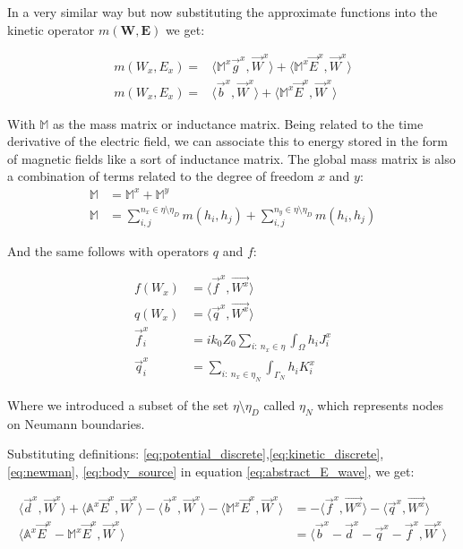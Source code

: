 In a very similar way but now substituting the approximate functions into the kinetic operator $m(\mathbf{W},\mathbf{E})$ we get:

\begin{align}
m\left(W_x,E_x\right)=&\langle \mathbb{M}^x\vec{g}^x,\vec{W}^x\rangle
+\langle\mathbb{M}^x\vec{E}^x,\vec{W}^x\rangle\nonumber \\
m\left(W_x,E_x\right)=&\langle \vec{b}^x,\vec{W}^x\rangle
+\langle\mathbb{M}^x\vec{E}^x,\vec{W}^x\rangle \label{eq:kinetic_discrete}
\end{align}

With $\mathbb{M}$ as the mass matrix or inductance matrix. Being related to the time derivative of the electric field, we can associate this to energy stored in the form of magnetic fields like a sort of inductance matrix. The global mass matrix is also a combination of terms related to the degree of freedom $x$ and $y$:
\begin{align*}
\mathbb{M} &= \mathbb{M}^x+\mathbb{M}^y\\
\mathbb{M} &= \sum_{i,j}^{n_x \in \eta\setminus\eta_D} m(h_i,h_j)+\sum_{i,j}^{n_y \in \eta\setminus\eta_D} m(h_i,h_j)
\end{align*}

And the same follows with operators $q$ and $f$:

\begin{align}
f(W_x) &= \langle \vec{f}^x, \vec{W^x}\rangle \label{eq:body_source}\\
q(W_x) &= \langle \vec{q}^x, \vec{W^x}\rangle \label{eq:newman}\\
\vec{f}_i^x &= ik_0 Z_0\sum_{i:\ n_x \in \eta}\int_{\Omega} h_iJ_i^x\nonumber\\
\vec{q}_i^x&= \sum_{i:\ n_x \in \eta_N}\int_{\Gamma_N} h_iK_i^x \nonumber
\end{align}

Where we introduced a subset of the set $\eta  \setminus \eta_D$ called $\eta_N$ which represents nodes on Neumann boundaries.

Substituting definitions: \ref{eq:potential_discrete},\ref{eq:kinetic_discrete}, \ref{eq:newman},  \ref{eq:body_source} in equation \ref{eq:abstract_E_wave}, we get:

\begin{align}
\langle\vec{d}^x,\vec{W}^x\rangle
+\langle\mathbb{A}^x\vec{E}^x,\vec{W}^x\rangle-\langle \vec{b}^x,\vec{W}^x\rangle
-\langle\mathbb{M}^x\vec{E}^x,\vec{W}^x\rangle &= -\langle \vec{f}^x, \vec{W^x}\rangle-\langle \vec{q}^x, \vec{W^x}\rangle \nonumber\\
\langle\mathbb{A}^x\vec{E}^x- \mathbb{M}^x\vec{E}^x,\vec{W}^x \rangle &=\langle \vec{b}^x-\vec{d}^x-\vec{q}^x-\vec{f}^x , \vec{W}^x \rangle
\end{align}

